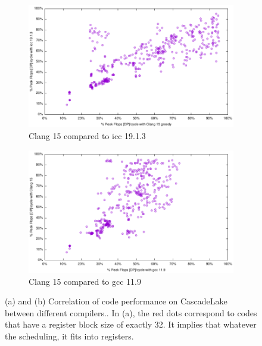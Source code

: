 \documentclass{article}
\begin{document}
\begin{figure}[h!]
  \begin{subfigure}[h]{0.45\textwidth}
  \includegraphics[width=\textwidth]{../benches/gemm/cascadelake-64x256x64/icc21xicc19.pdf}
  \caption{Clang 15 compared to icc 19.1.3}
  \end{subfigure}
  \begin{subfigure}[h]{0.45\textwidth}  
\includegraphics[width=\textwidth]{../benches/gemm/cascadelake-64x256x64/gccxgreedy.pdf}
  \caption{Clang 15 compared to gcc 11.9}
  \end{subfigure}

  \caption{(a) and (b) Correlation of code performance on CascadeLake between different compilers.\label{fig:cascadelakecorrelation}. In (a), the red dots correspond to codes that have a register block size of exactly 32. It implies that whatever the scheduling, it fits into registers.}
\end{figure}
\end{document}
